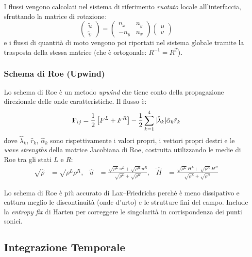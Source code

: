 I flussi vengono calcolati nel sistema di riferimento \emph{ruotato} locale all'interfaccia,
sfruttando la matrice di rotazione:
\begin{equation}
  \begin{pmatrix} \tilde{u} \\ \tilde{v} \end{pmatrix} =
  \begin{pmatrix} n_x & n_y \\ -n_y & n_x \end{pmatrix}
  \begin{pmatrix} u \\ v \end{pmatrix}
\end{equation}
e i flussi di quantità di moto vengono poi riportati nel sistema globale tramite la trasposta
della stessa matrice (che è ortogonale: $R^{-1} = R^T$).

\subsubsection{Schema di Roe (Upwind)}

Lo schema di Roe è un metodo \emph{upwind} che tiene conto della propagazione direzionale
delle onde caratteristiche. Il flusso è:
\begin{equation}
  \mathbf{F}_{ij} = \frac{1}{2}\left[F^L + F^R\right]
               - \frac{1}{2} \sum_{k=1}^{4} |\hat{\lambda}_k| \hat{\alpha}_k \hat{r}_k
\end{equation}
dove $\hat{\lambda}_k$, $\hat{r}_k$, $\hat{\alpha}_k$ sono rispettivamente i valori propri,
i vettori propri destri e le \emph{wave strengths} della matrice Jacobiana di Roe, costruita
utilizzando le medie di Roe tra gli stati $L$ e $R$:
\begin{align}
  \sqrt{\hat{\rho}} &= \sqrt{\rho^L\rho^R}, &
  \hat{u} &= \frac{\sqrt{\rho^L}\,u^L + \sqrt{\rho^R}\,u^R}{\sqrt{\rho^L}+\sqrt{\rho^R}}, &
  \hat{H} &= \frac{\sqrt{\rho^L}\,H^L + \sqrt{\rho^R}\,H^R}{\sqrt{\rho^L}+\sqrt{\rho^R}}
\end{align}

Lo schema di Roe è più accurato di Lax--Friedrichs perché è meno dissipativo e cattura
meglio le discontinuità (onde d'urto) e le strutture fini del campo. Include la
\textit{entropy fix} di Harten per correggere le singolarità in corrispondenza dei punti sonici.

\subsection{Integrazione Temporale}


